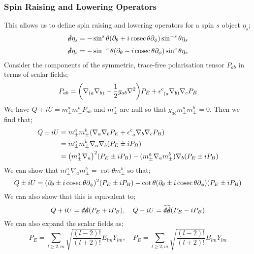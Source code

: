 \subsubsection*{Spin Raising and Lowering Operators}
This allows us to define spin raising and lowering operators for a spin $s$ object $\eta_s$;
\begin{align*}
\slashed{d} \eta_s &= -\sin^s \theta \left(\del_\theta + i\cosec \theta \del_\phi\right)\sin^{-s}\theta \eta_s \\
\bar{\slashed{d}} \eta_s &= -\sin^{-s}\theta \left(\del_\theta - i \cosec \theta \del_\phi\right)\sin^s \theta \eta_s
\end{align*}
Consider the components of the symmetric, trace-free polarisation tensor $P_{ab}$ in terms of scalar fields;
\begin{equation*}
P_{ab} = \left(\nabla_{(a}\nabla_{b)}- \frac{1}{2}g_{ab}\nabla^2\right)P_E + \epsilon\indices{^{c}_{(a}}\nabla_{b)}\nabla_c P_B
\end{equation*}
We have $Q \pm i U = m_{\pm}^{a}m_{\pm}^{b}P_{ab}$ and $m_{\pm}^{a}$ are null so that $g_{ab}m^{a}_{\pm}m^{b}_{\pm} = 0$. Then we find that;
\begin{align*}
Q\pm iU &= m_{\pm}^{a}m_{\pm}^{b}\left(\nabla_a \nabla_b P_E + \epsilon\indices{^{c}_{a}}\nabla_b \nabla_c P_B\right) \\
&= m_{\pm}^{a}m_{\pm}^{b}\nabla_a\nabla_b\left(P_E \pm i P_B\right) \\
&= \left(m_{\pm}^{a}\nabla_a\right)^2 \left(P_E \pm i P_B\right) - (m_{\pm}^{a}\nabla_a m_{\pm}^{b})\nabla_b\left(P_E \pm iP_B\right)
\end{align*}
We can show that $m_{\pm}^{a}\nabla_a m_{\pm}^{b} = \cot \theta m_{\pm}^{b}$ so that;
\begin{equation}
Q\pm iU = (\del_\theta \pm i \cosec \theta \del_\phi)^{2}\left(P_E \pm iP_B\right) - \cot \theta (\del_\theta \pm i\cosec \theta \del_\phi)\left(P_E \pm iP_B\right)
\end{equation}
We can also show that this is equivalent to;
\begin{equation*}
Q + iU = \slashed{d}\slashed{d}\left(P_E + iP_B\right), \quad Q - iU = \bar{\slashed{d}}\bar{\slashed{d}}\left(P_E - iP_B\right)
\end{equation*}
We can also expand the scalar fields as;
\begin{equation}
P_E = \sum_{l\geq 2, m}{\sqrt{\frac{(l - 2)!}{(l + 2)!}}E_{lm}Y_{lm}}, \quad P_E = \sum_{l\geq 2, m}{\sqrt{\frac{(l - 2)!}{(l + 2)!}}B_{lm}Y_{lm}}
\end{equation}
